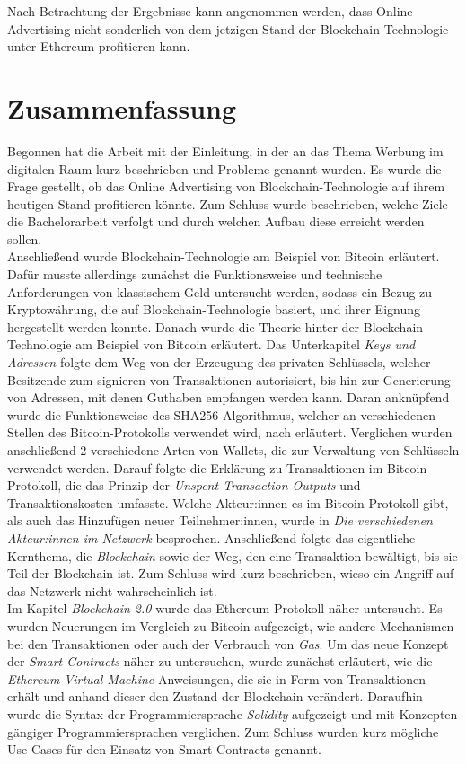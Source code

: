 Nach Betrachtung der Ergebnisse kann angenommen werden, dass Online Advertising nicht sonderlich von dem jetzigen Stand der Blockchain-Technologie unter Ethereum profitieren kann.
\section{Zusammenfassung}
Begonnen hat die Arbeit mit der Einleitung, in der an das Thema Werbung im digitalen Raum kurz beschrieben und Probleme genannt wurden. Es wurde die Frage gestellt, ob das Online Advertising von Blockchain-Technologie auf ihrem heutigen Stand profitieren könnte. Zum Schluss wurde beschrieben, welche Ziele die Bachelorarbeit verfolgt und durch welchen Aufbau diese erreicht werden sollen.\\
 
Anschließend wurde Blockchain-Technologie am Beispiel von Bitcoin erläutert. Dafür musste allerdings zunächst die Funktionsweise und technische Anforderungen von klassischem Geld untersucht werden, sodass ein Bezug zu Kryptowährung, die auf Blockchain-Technologie basiert, und ihrer Eignung hergestellt werden konnte. 
Danach wurde die Theorie hinter der Blockchain-Technologie am Beispiel von Bitcoin erläutert. 
Das Unterkapitel \emph{Keys und Adressen} folgte dem Weg von der Erzeugung des privaten Schlüssels, welcher Besitzende zum signieren von Transaktionen autorisiert, bis hin zur Generierung von Adressen, mit denen Guthaben empfangen werden kann. 
Daran anknüpfend wurde die Funktionsweise des SHA256-Algorithmus, welcher an verschiedenen Stellen des Bitcoin-Protokolls verwendet wird, nach \cite{dang_2015} erläutert. 
Verglichen wurden anschließend 2 verschiedene Arten von Wallets, die zur Verwaltung von Schlüsseln verwendet werden.
Darauf folgte die Erklärung zu Transaktionen im Bitcoin-Protokoll, die das Prinzip der \emph{Unspent Transaction Outputs} und Transaktionskosten umfasste.
Welche Akteur:innen es im Bitcoin-Protokoll gibt, als auch das Hinzufügen neuer Teilnehmer:innen, wurde in \emph{Die verschiedenen Akteur:innen im Netzwerk} besprochen.
Anschließend folgte das eigentliche Kernthema, die \emph{Blockchain} sowie der Weg, den eine Transaktion bewältigt, bis sie Teil der Blockchain ist. Zum Schluss wird kurz beschrieben, wieso ein Angriff auf das Netzwerk nicht wahrscheinlich ist.\\

Im Kapitel \emph{Blockchain 2.0} wurde das Ethereum-Protokoll näher untersucht. Es wurden Neuerungen im Vergleich zu Bitcoin aufgezeigt, wie andere Mechanismen bei den Transaktionen oder auch der Verbrauch von \emph{Gas}.
Um das neue Konzept der \emph{Smart-Contracts} näher zu untersuchen, wurde zunächst erläutert, wie die \emph{Ethereum Virtual Machine} Anweisungen, die sie in Form von Transaktionen erhält und anhand dieser den Zustand der Blockchain verändert. Daraufhin wurde die Syntax der Programmiersprache \emph{Solidity} aufgezeigt und mit Konzepten gängiger Programmiersprachen verglichen.
Zum Schluss wurden kurz mögliche Use-Cases für den Einsatz von Smart-Contracts genannt.\\

